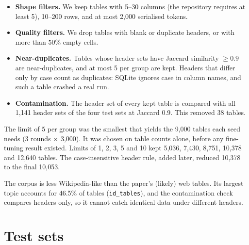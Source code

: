 \begin{itemize}
\item \textbf{Shape filters.} We keep tables with 5--30 columns (the repository requires at least 5), 10--200 rows, and
at most 2,000 serialised tokens.
\item \textbf{Quality filters.} We drop tables with blank or duplicate headers, or with more than 50\% empty cells.
\item \textbf{Near-duplicates.} Tables whose header sets have Jaccard similarity $\ge 0.9$ are near-duplicates, and at
most 5 per group are kept. Headers that differ only by case count as duplicates: SQLite ignores case in column names,
and such a table crashed a real run.
\item \textbf{Contamination.} The header set of every kept table is compared with all 1,141 header sets of the four
test sets at Jaccard 0.9. This removed 38 tables.
\end{itemize}

The limit of 5 per group was the smallest that yields the 9,000 tables each seed needs (3 rounds $\times$ 3,000). It
was chosen on table counts alone, before any fine-tuning result existed. Limits of 1, 2, 3, 5 and 10 kept 5,036, 7,430,
8,751, 10,378 and 12,640 tables. The case-insensitive header rule, added later, reduced 10,378 to the final 10,053.

\begin{observation}
The corpus is less Wikipedia-like than the paper's (likely) web tables. Its largest topic accounts for 46.5\% of
tables (\texttt{id\_tables}), and the contamination check compares headers only, so it cannot catch identical data
under different headers.
\end{observation}



\section{Test sets}\label{sec:testsets}

